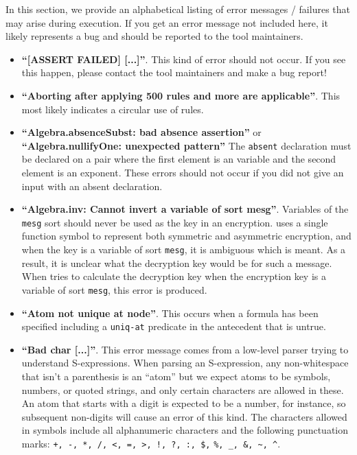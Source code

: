 In this section, we provide an alphabetical listing of error messages
/ failures that may arise during {\cpsa} execution.  If you get an error
message not included here, it likely represents a bug and should be reported
to the tool maintainers.

\begin{itemize}
\item \textbf{``[ASSERT FAILED] [...]''}.  This kind of error should
  not occur.  If you see this happen, please contact the tool maintainers
  and make a bug report!

\item \textbf{``Aborting after applying 500 rules and more are
  applicable''}.  This most likely indicates a circular use of rules.

\item \textbf{``Algebra.absenceSubst: bad absence assertion''} or
  \textbf{``Algebra.nullifyOne: unexpected pattern''} The
  \texttt{absent} declaration must be declared on a pair where the
  first element is an  variable and the second element is 
  an exponent.
  These errors should not occur if you did not give {\cpsa} an input
  with an absent declaration.

\item \textbf{``Algebra.inv: Cannot invert a variable of sort mesg''}.
  Variables of the \texttt{mesg} sort should never be used as the key
  in an encryption.  {\cpsa} uses a single function symbol to represent
  both symmetric and asymmetric encryption, and when the key is a variable
  of sort \texttt{mesg}, it is ambiguous which is meant.  As a result,
  it is unclear what the decryption key would be for such a message.  When
  {\cpsa} tries to calculate the decryption key when the encryption key
  is a variable of sort \texttt{mesg}, this error is produced.

\item \textbf{``Atom not unique at node''}.  This occurs when a
  formula has been specified including a \texttt{uniq-at} predicate in
  the antecedent that is untrue.

\item \textbf{``Bad char [...]''}.  This error message comes from a
  low-level parser trying to understand S-expressions.  When parsing
  an S-expression, any non-whitespace that isn't a parenthesis is an
  ``atom'' but we expect atoms to be symbols, numbers, or quoted
  strings, and only certain characters are allowed in these.  An atom
  that starts with a digit is expected to be a number, for instance, so
  subsequent non-digits will cause an error of this kind.  The characters
  allowed in symbols include all alphanumeric characters and the following
  punctuation marks: \verb|+, -, *, /, <, =, >, !, ?, :, $,|  \verb|%, _, &, ~, ^|.


\end{itemize}
